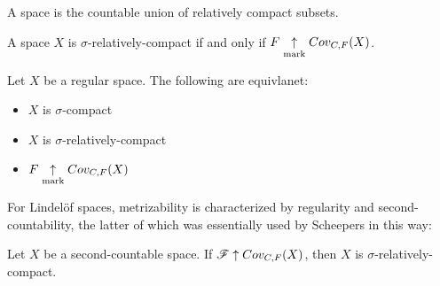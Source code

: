 \begin{defn}
  A  space is the countable union of
  relatively compact subsets.
\end{defn}

\begin{cor}
  A space $X$ is $\sigma$-relatively-compact if and only if
  $F \underset{\text{mark}}{\uparrow} Cov_{C,F}(X)$.
\end{cor}

\begin{cor}
  Let $X$ be a regular space. The following are equivlanet:
  \begin{itemize}
    \item $X$ is $\sigma$-compact
    \item $X$ is $\sigma$-relatively-compact
    \item $F \underset{\text{mark}}{\uparrow} Cov_{C,F}(X)$
  \end{itemize}
\end{cor}

For Lindel\"of spaces, metrizability is characterized by regularity and
second-countability, the latter of which was essentially used by Scheepers in
this way:

\begin{lem}
  Let $X$ be a second-countable space. If $\mathscr{F}\uparrow Cov_{C,F}(X)$, then
  $X$ is $\sigma$-relatively-compact.
\end{lem}

